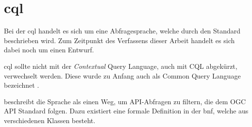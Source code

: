 \section{\acl{cql}}

Bei der \acf{cql} handelt es sich um eine Abfragesprache, welche durch den Standard
beschrieben wird. Zum Zeitpunkt des Verfassens dieser
Arbeit handelt es sich dabei noch um einen Entwurf.

\ac{cql} sollte nicht mit der \textit{Contextual} Query Language, auch mit CQL abgekürzt,
verwechselt werden. Diese wurde zu Anfang auch als Common Query Language bezeichnet
\parencite{ZINGGentle2003}. 

 beschreibt die Sprache als einen Weg, um
API-Abfragen zu filtern, die dem OGC API Standard folgen. Dazu existiert eine formale Definition in
der \ac{bnf}, welche aus verschiedenen Klassen besteht.
